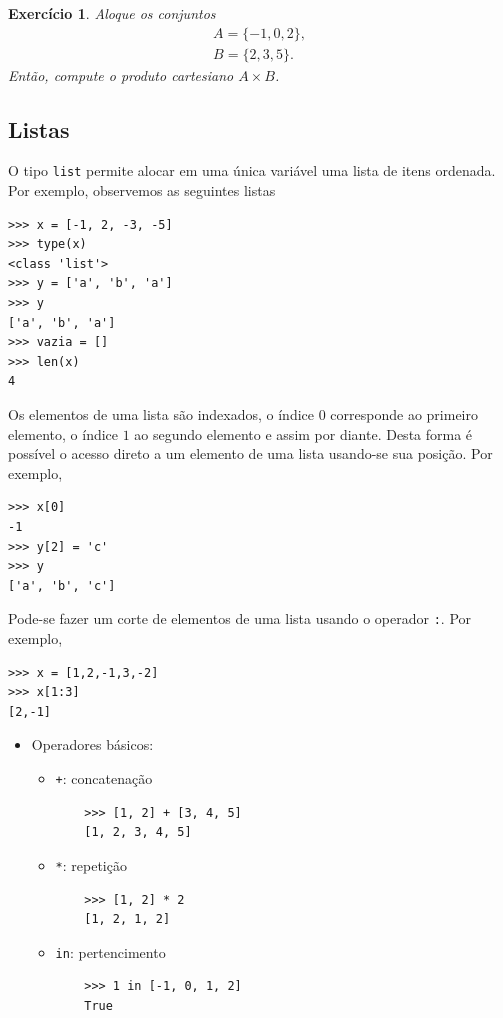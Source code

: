 \documentclass[12pt]{article}
\newtheorem{exr}{Exercício}[section]
\begin{document}
\begin{exr}
  Aloque os conjuntos
  \begin{gather}
    A = \{-1, 0, 2\},\\
    B = \{2, 3, 5\}.
  \end{gather}
  Então, compute o produto cartesiano $A\times B$.
\end{exr}

\subsection{Listas}

O tipo {\python} \lstinline+list+ permite alocar em uma única variável uma lista de itens ordenada. Por exemplo, observemos as seguintes listas
\begin{lstlisting}
>>> x = [-1, 2, -3, -5]
>>> type(x)
<class 'list'>
>>> y = ['a', 'b', 'a']
>>> y
['a', 'b', 'a']
>>> vazia = []
>>> len(x)
4
\end{lstlisting}

Os elementos de uma lista são indexados, o índice $0$ corresponde ao primeiro elemento, o índice $1$ ao segundo elemento e assim por diante. Desta forma é possível o acesso direto a um elemento de uma lista usando-se sua posição. Por exemplo,
\begin{lstlisting}
>>> x[0]
-1
>>> y[2] = 'c'
>>> y
['a', 'b', 'c']
\end{lstlisting}
Pode-se fazer um corte de elementos de uma lista usando o operador \lstinline+:+. Por exemplo,
\begin{lstlisting}
>>> x = [1,2,-1,3,-2]
>>> x[1:3]
[2,-1]
\end{lstlisting}

\begin{itemize}
\item Operadores básicos:
  \begin{itemize}
  \item[] \lstinline-+-: concatenação
    \begin{lstlisting}
    >>> [1, 2] + [3, 4, 5]
    [1, 2, 3, 4, 5]
    \end{lstlisting}
  \item[] \lstinline+*+: repetição
    \begin{lstlisting}
    >>> [1, 2] * 2
    [1, 2, 1, 2]
    \end{lstlisting}
  \item[] \lstinline+in+: pertencimento
    \begin{lstlisting}
    >>> 1 in [-1, 0, 1, 2]
    True
    \end{lstlisting}
  \end{itemize}
\end{itemize}
\end{document}
